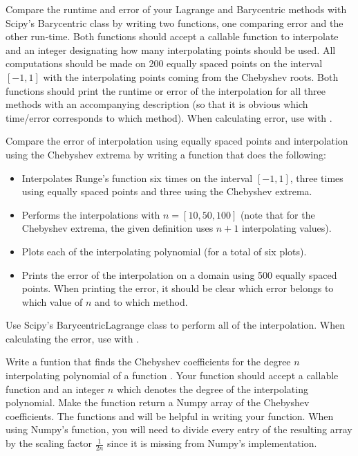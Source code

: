 Compare the runtime and error of your Lagrange and Barycentric methods with Scipy's Barycentric class by writing two functions, one comparing error and the other run-time.
Both functions should accept a callable function to interpolate and an integer designating how many interpolating points should be used.
All computations should be made on 200 equally spaced points on the interval $[-1, 1]$ with the interpolating points coming from the Chebyshev roots.
Both functions should print the runtime or error of the interpolation for all three methods with an accompanying description (so that it is obvious which time/error corresponds to which method).
When calculating error, use  with .

Compare the error of interpolation using equally spaced points and interpolation using the Chebyshev extrema by writing a function that does the following:
\begin{itemize}
\item Interpolates Runge's function six times on the interval $[-1,1]$, three times using equally spaced points and three using the Chebyshev extrema.
\item Performs the interpolations with $n=[10,50,100]$ (note that for the Chebyshev extrema, the given definition uses $n+1$ interpolating values).
\item Plots each of the interpolating polynomial (for a total of six plots).
\item Prints the error of the interpolation on a domain using 500 equally spaced points.  When printing the error, it should be clear which error belongs to which value of $n$ and to which method.
\end{itemize}
Use Scipy's BarycentricLagrange class to perform all of the interpolation.
When calculating the error, use  with .

Write a funtion that finds the Chebyshev coefficients for the degree $n$ interpolating polynomial of a function .
Your function should accept a callable function  and an integer $n$ which denotes the degree of the interpolating polynomial.
Make the function return a Numpy array of the Chebyshev coefficients.
The functions  and  will be helpful in writing your function.
When using Numpy's  function, you will need to divide every entry of the resulting array by the scaling factor $\frac{1}{2n}$ since it is missing from Numpy's implementation.

